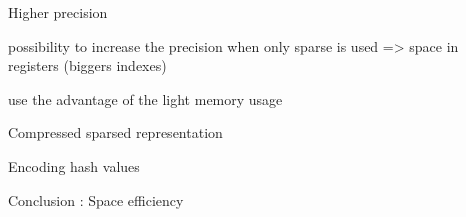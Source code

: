 \documentclass{beamer}
\begin{document}

\begin{frame}{Higher precision}
  
  possibility to increase the precision when only sparse is used =>
  space in registers (biggers indexes)

  use the advantage of the light memory usage
  

\end{frame}

\begin{frame}{Compressed sparsed representation}
\end{frame}



\begin{frame}{Encoding hash values}
\end{frame}

\begin{frame}{Conclusion : Space efficiency}
\end{frame}
\end{document}
